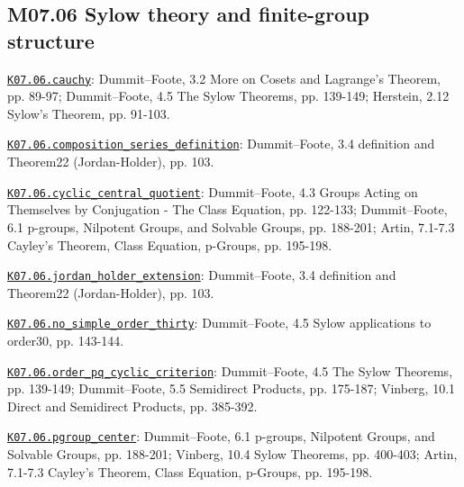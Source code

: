 \subsection*{M07.06 Sylow theory and finite-group structure}
\par\smallskip\noindent\hypertarget{src:K07.06.cauchy}{}\label{src:K07.06.cauchy}\hyperref[K07.06.cauchy]{\texttt{K07.06.cauchy}}: Dummit--Foote, 3.2 More on Cosets and Lagrange's Theorem, pp. 89-97; Dummit--Foote, 4.5 The Sylow Theorems, pp. 139-149; Herstein, 2.12 Sylow's Theorem, pp. 91-103.
\par\smallskip\noindent\hypertarget{src:K07.06.composition_series_definition}{}\label{src:K07.06.composition_series_definition}\hyperref[K07.06.composition_series_definition]{\texttt{K07.06.composition\_series\_definition}}: Dummit--Foote, 3.4 definition and Theorem22 (Jordan-Holder), pp. 103.
\par\smallskip\noindent\hypertarget{src:K07.06.cyclic_central_quotient}{}\label{src:K07.06.cyclic_central_quotient}\hyperref[K07.06.cyclic_central_quotient]{\texttt{K07.06.cyclic\_central\_quotient}}: Dummit--Foote, 4.3 Groups Acting on Themselves by Conjugation - The Class Equation, pp. 122-133; Dummit--Foote, 6.1 p-groups, Nilpotent Groups, and Solvable Groups, pp. 188-201; Artin, 7.1-7.3 Cayley's Theorem, Class Equation, p-Groups, pp. 195-198.
\par\smallskip\noindent\hypertarget{src:K07.06.jordan_holder_extension}{}\label{src:K07.06.jordan_holder_extension}\hyperref[K07.06.jordan_holder_extension]{\texttt{K07.06.jordan\_holder\_extension}}: Dummit--Foote, 3.4 definition and Theorem22 (Jordan-Holder), pp. 103.
\par\smallskip\noindent\hypertarget{src:K07.06.no_simple_order_thirty}{}\label{src:K07.06.no_simple_order_thirty}\hyperref[K07.06.no_simple_order_thirty]{\texttt{K07.06.no\_simple\_order\_thirty}}: Dummit--Foote, 4.5 Sylow applications to order30, pp. 143-144.
\par\smallskip\noindent\hypertarget{src:K07.06.order_pq_cyclic_criterion}{}\label{src:K07.06.order_pq_cyclic_criterion}\hyperref[K07.06.order_pq_cyclic_criterion]{\texttt{K07.06.order\_pq\_cyclic\_criterion}}: Dummit--Foote, 4.5 The Sylow Theorems, pp. 139-149; Dummit--Foote, 5.5 Semidirect Products, pp. 175-187; Vinberg, 10.1 Direct and Semidirect Products, pp. 385-392.
\par\smallskip\noindent\hypertarget{src:K07.06.pgroup_center}{}\label{src:K07.06.pgroup_center}\hyperref[K07.06.pgroup_center]{\texttt{K07.06.pgroup\_center}}: Dummit--Foote, 6.1 p-groups, Nilpotent Groups, and Solvable Groups, pp. 188-201; Vinberg, 10.4 Sylow Theorems, pp. 400-403; Artin, 7.1-7.3 Cayley's Theorem, Class Equation, p-Groups, pp. 195-198.
